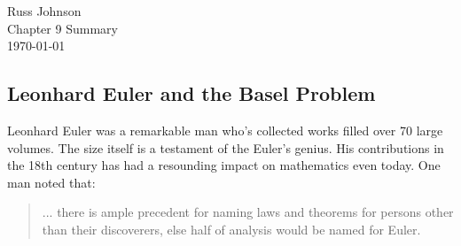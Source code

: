 \documentclass[12pt]{article}
\begin{document}
\begin{flushright}
Russ Johnson\\
Chapter 9 Summary\\
\today\\
\end{flushright}

\begin{doublespace}

\section*{Leonhard Euler and the Basel Problem}
Leonhard Euler was a remarkable man who's collected works filled over 70 large volumes. The size itself is a testament of the Euler's genius. His contributions in the 18th century has had a resounding impact on mathematics even today. One man noted that:
%
\end{doublespace}
\vspace{-5mm}
\begin{quote}
... there is ample precedent for naming laws and theorems for persons    
other than their discoverers, else half of analysis would be named for Euler.
\end{quote}
\vspace{-5mm}
\end{document}
